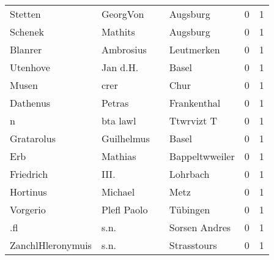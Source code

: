 \documentclass[10pt,a4paper,landscape]{article}
\begin{document}
\begin{longtable}{llllrr}
                  Stetten &                           GeorgVon &             &                                    Augsburg &          0 &         1 \\
                  Schenek &                            Mathits &             &                                    Augsburg &          0 &         1 \\
                  Blanrer &                          Ambrosius &             &                                  Leutmerken &          0 &         1 \\
                 Utenhove &                           Jan d.H. &             &                                       Basel &          0 &         1 \\
                    Musen &                               crer &             &                                        Chur &          0 &         1 \\
                 Dathenus &                             Petras &             &                                 Frankenthal &          0 &         1 \\
                        n &                           bta lawl &             &                                  Ttwrvizt T &          0 &         1 \\
               Gratarolus &                         Guilhelmus &             &                                       Basel &          0 &         1 \\
                      Erb &                            Mathias &             &                              Bappeltwweiler &          0 &         1 \\
                Friedrich &                               III. &             &                                    Lohrbach &          0 &         1 \\
                 Hortinus &                            Michael &             &                                        Metz &          0 &         1 \\
                 Vorgerio &                        Plefl Paolo &             &                                    Tübingen &          0 &         1 \\
                      .fl &                               s.n. &             &                               Sorsen Andres &          0 &         1 \\
        ZanchlHleronymuis &                               s.n. &             &                                 Strasstours &          0 &         1 \\

\end{longtable}
\end{document}
